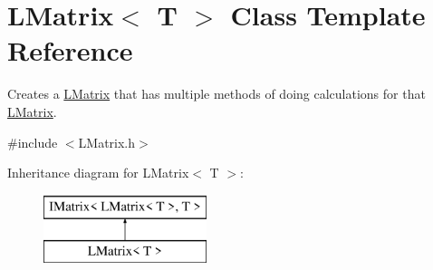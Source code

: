 \hypertarget{class_l_matrix}{}\section{L\+Matrix$<$ T $>$ Class Template Reference}
\label{class_l_matrix}


Creates a \mbox{\hyperlink{class_l_matrix}{L\+Matrix}} that has multiple methods of doing calculations for that \mbox{\hyperlink{class_l_matrix}{L\+Matrix}}.  




{\ttfamily \#include $<$L\+Matrix.\+h$>$}

Inheritance diagram for L\+Matrix$<$ T $>$\+:\begin{figure}[H]
\begin{center}
\leavevmode
\includegraphics[height=2.000000cm]{class_l_matrix}
\end{center}
\end{figure}
